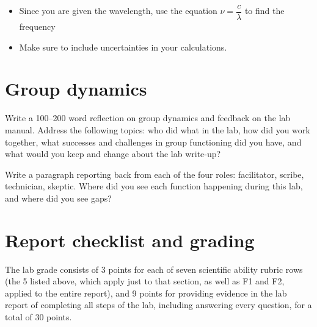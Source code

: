 \begin{steps}
\begin{itemize}
		\item Since you are given the wavelength, use the equation $\nu = \dfrac{c}{\lambda}$ to find the frequency
		
		\item Make sure to include uncertainties in your calculations.
	\end{itemize}
\end{steps}

\section{Group dynamics}

\begin{steps}
	\item Write a 100--200 word reflection on group dynamics and feedback on the lab manual. Address the following topics: who did what in the lab, how did you work together, what successes and challenges in group functioning did you have, and what would you keep and change about the lab write-up?
	
	\item Write a paragraph reporting back from each of the four roles: facilitator, scribe, technician, skeptic. Where did you see each function happening during this lab, and where did you see gaps?
\end{steps}

\section{Report checklist and grading}

The lab grade consists of 3 points for each of seven scientific ability rubric rows (the 5 listed above, which apply just to that section, as well as F1 and F2, applied to the entire report), and 9 points for providing evidence in the lab report of completing all steps of the lab, including answering every question, for a total of 30 points.